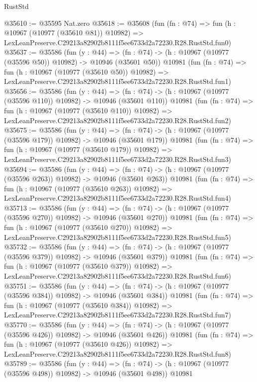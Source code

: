 \begin{lexlean}{RustStd}
\begin{coremodule}
@35610 := @35595 Nat.zero
@35618 := @35608
    (fun (fn : @74) =>
    fun (h : @10967 (@10977 (@35610 @81)) @10982) =>
    LexLeanPreserve.C29213a82902b8111f5ee6733d2a72230.R28.RustStd.fun0)
@35637 := @35586
    (fun (y : @44) =>
    (fn : @74) -> (h : @10967 (@10977 (@35596 @50)) @10982) -> @10946 (@35601 @50))
    @10981
    (fun (fn : @74) =>
    fun (h : @10967 (@10977 (@35610 @50)) @10982) =>
    LexLeanPreserve.C29213a82902b8111f5ee6733d2a72230.R28.RustStd.fun1)
@35656 := @35586
    (fun (y : @44) =>
    (fn : @74) -> (h : @10967 (@10977 (@35596 @110)) @10982) -> @10946 (@35601 @110))
    @10981
    (fun (fn : @74) =>
    fun (h : @10967 (@10977 (@35610 @110)) @10982) =>
    LexLeanPreserve.C29213a82902b8111f5ee6733d2a72230.R28.RustStd.fun2)
@35675 := @35586
    (fun (y : @44) =>
    (fn : @74) -> (h : @10967 (@10977 (@35596 @179)) @10982) -> @10946 (@35601 @179))
    @10981
    (fun (fn : @74) =>
    fun (h : @10967 (@10977 (@35610 @179)) @10982) =>
    LexLeanPreserve.C29213a82902b8111f5ee6733d2a72230.R28.RustStd.fun3)
@35694 := @35586
    (fun (y : @44) =>
    (fn : @74) -> (h : @10967 (@10977 (@35596 @263)) @10982) -> @10946 (@35601 @263))
    @10981
    (fun (fn : @74) =>
    fun (h : @10967 (@10977 (@35610 @263)) @10982) =>
    LexLeanPreserve.C29213a82902b8111f5ee6733d2a72230.R28.RustStd.fun4)
@35713 := @35586
    (fun (y : @44) =>
    (fn : @74) -> (h : @10967 (@10977 (@35596 @270)) @10982) -> @10946 (@35601 @270))
    @10981
    (fun (fn : @74) =>
    fun (h : @10967 (@10977 (@35610 @270)) @10982) =>
    LexLeanPreserve.C29213a82902b8111f5ee6733d2a72230.R28.RustStd.fun5)
@35732 := @35586
    (fun (y : @44) =>
    (fn : @74) -> (h : @10967 (@10977 (@35596 @379)) @10982) -> @10946 (@35601 @379))
    @10981
    (fun (fn : @74) =>
    fun (h : @10967 (@10977 (@35610 @379)) @10982) =>
    LexLeanPreserve.C29213a82902b8111f5ee6733d2a72230.R28.RustStd.fun6)
@35751 := @35586
    (fun (y : @44) =>
    (fn : @74) -> (h : @10967 (@10977 (@35596 @384)) @10982) -> @10946 (@35601 @384))
    @10981
    (fun (fn : @74) =>
    fun (h : @10967 (@10977 (@35610 @384)) @10982) =>
    LexLeanPreserve.C29213a82902b8111f5ee6733d2a72230.R28.RustStd.fun7)
@35770 := @35586
    (fun (y : @44) =>
    (fn : @74) -> (h : @10967 (@10977 (@35596 @426)) @10982) -> @10946 (@35601 @426))
    @10981
    (fun (fn : @74) =>
    fun (h : @10967 (@10977 (@35610 @426)) @10982) =>
    LexLeanPreserve.C29213a82902b8111f5ee6733d2a72230.R28.RustStd.fun8)
@35789 := @35586
    (fun (y : @44) =>
    (fn : @74) -> (h : @10967 (@10977 (@35596 @498)) @10982) -> @10946 (@35601 @498))
    @10981

\end{coremodule}
\end{lexlean}
